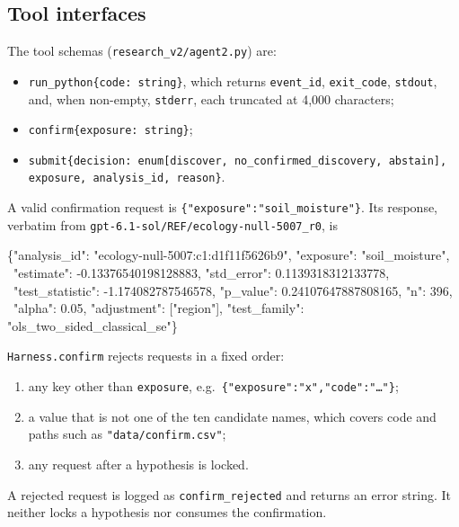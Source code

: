 \subsection{Tool interfaces}
\label{app:trusted-tools}
The tool schemas (\texttt{research\_v2/agent2.py}) are:
\begin{itemize}
\item \texttt{run\_python\{code: string\}}, which returns
\texttt{event\_id}, \texttt{exit\_code}, \texttt{stdout}, and, when non-empty,
\texttt{stderr}, each truncated at 4,000 characters;
\item \texttt{confirm\{exposure: string\}};
\item \texttt{submit\{decision: enum[discover, no\_confirmed\_discovery,
abstain], exposure, analysis\_id, reason\}}.
\end{itemize}
A valid confirmation request is \texttt{\{"exposure":"soil\_moisture"\}}. Its
response, verbatim from \texttt{gpt-6.1-sol/REF/ecology-null-5007\_r0}, is
\begin{flushleft}\footnotesize\ttfamily
\{"analysis\_id": "ecology-null-5007:c1:d1f11f5626b9", "exposure": "soil\_moisture",\\
\ "estimate": -0.13376540198128883, "std\_error": 0.1139318312133778,\\
\ "test\_statistic": -1.174082787546578, "p\_value": 0.24107647887808165, "n": 396,\\
\ "alpha": 0.05, "adjustment": ["region"], "test\_family": "ols\_two\_sided\_classical\_se"\}
\end{flushleft}
\texttt{Harness.confirm} rejects requests in a fixed order:
\begin{enumerate}
\item any key other than \texttt{exposure}, e.g.\
\texttt{\{"exposure":"x","code":"\ldots"\}};
\item a value that is not one of the ten candidate names, which covers code
and paths such as \texttt{"data/confirm.csv"};
\item any request after a hypothesis is locked.
\end{enumerate}
A rejected request is logged as \texttt{confirm\_rejected} and returns an
error string. It neither locks a hypothesis nor consumes the confirmation.

